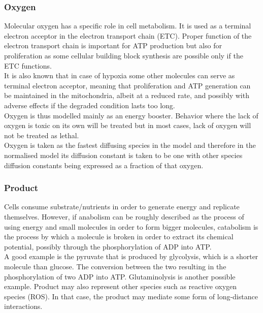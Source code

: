 \documentclass[11pt,a4paper]{article}
\begin{document}
\subsubsection{Oxygen}
Molecular oxygen has a specific role in cell metabolism. It is used as a terminal electron acceptor in the electron transport chain (ETC). Proper function of the electron transport chain is important for ATP production but also for proliferation as some cellular building block synthesis are possible only if the ETC functions.\cite{Martinez2020}\\

It is also known that in case of hypoxia some other molecules can serve as terminal electron acceptor, meaning that proliferation and ATP generation can be maintained in the mitochondria, albeit at a reduced rate, and possibly with adverse effects if the degraded condition lasts too long.\cite{Spinelli2021}\\

Oxygen is thus modelled mainly as an energy booster. Behavior where the lack of oxygen is toxic on its own will be treated but in most cases, lack of oxygen will not be treated as lethal.\\

Oxygen is taken as the fastest diffusing species in the model and therefore in the normalised model its diffusion constant is taken to be one with other species diffusion constants being expressed as a fraction of that oxygen.\\

\subsubsection{Product}
Cells consume substrate/nutrients in order to generate energy and replicate themselves. However, if anabolism can be roughly described as the process of using energy and small molecules in order to form bigger molecules, catabolism is the process by which a molecule is broken in order to extract its chemical potential, possibly through the phosphorylation of ADP into ATP.\\

A good example is the pyruvate that is produced by glycolysis, which is a shorter molecule than glucose. The conversion between the two resulting in the phosphorylation of two ADP into ATP. Glutaminolysis is another possible example. Product may also represent other species such as reactive oxygen species (ROS). In that case, the product may mediate some form of long-distance interactions.\\
\end{document}
